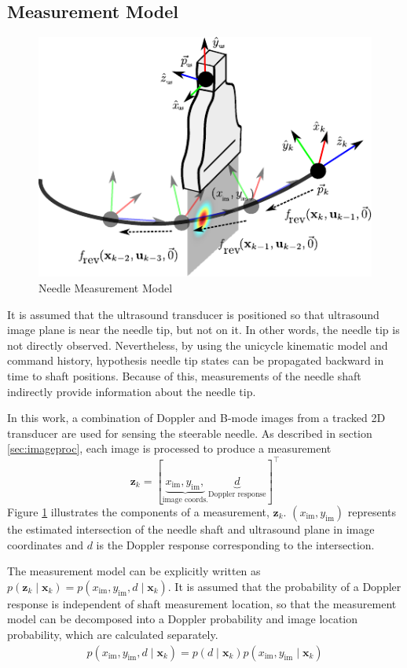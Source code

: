 \documentclass[journal,transmag]{IEEEtran}
\newcommand{\bvar}[2]{\mathbf{#1}_{#2}}
\newcommand{\meas}[1][k]{p(\mathbf{z}_{#1} \mid \mathbf{x}_{#1})}
\newcommand{\imcoords}{(x_{\text{im}},y_{\text{im}})}
\begin{document}
\subsection{Measurement Model} \label{subsec:measurement}
\begin{figure}[]
\centering
\includegraphics[scale=1]{Figures/NeedleMeasurements.pdf}
\caption{Needle Measurement Model}
\label{fig_mm}
\end{figure}
It is assumed that the ultrasound transducer is positioned so that ultrasound image plane is near the needle tip, but not on it.  In other words, the needle tip is not directly observed.  Nevertheless, by using the unicycle kinematic model and command history, hypothesis needle tip states can be propagated backward in time to shaft positions.  Because of this, measurements of the needle shaft indirectly provide information about the needle tip.

In this work, a combination of Doppler and B-mode images from a tracked 2D transducer are used for sensing the steerable needle.  As described in section \ref{sec:imageproc}, each image is processed to produce a measurement
\begin{dmath*}
\bvar{z}{k} = \left[\underbrace{x_{\text{im}},y_{\text{im}},}_{\text{image coords.}} \underbrace{d}_{\text{Doppler response}}\right]^\top
\end{dmath*}
Figure \ref{fig_mm} illustrates the components of a measurement, $\bvar{z}{k}$.  $\imcoords$ represents the estimated intersection of the needle shaft and ultrasound plane in image coordinates and $d$ is the Doppler response corresponding to the intersection.

The measurement model can be explicitly written as $\meas = p(x_{\text{im}}, y_{\text{im}}, d \mid \bvar{x}{k})$.  It is assumed that the probability of a Doppler response is independent of shaft measurement location, so that the measurement model can be decomposed into a Doppler probability and image location probability, which are calculated separately. 
\begin{align*}
p(x_{\text{im}}, y_{\text{im}}, d \mid \bvar{x}{k}) = p(d \mid \bvar{x}{k}) p(x_{\text{im}}, y_{\text{im}} \mid \bvar{x}{k})
\end{align*}
\end{document}
